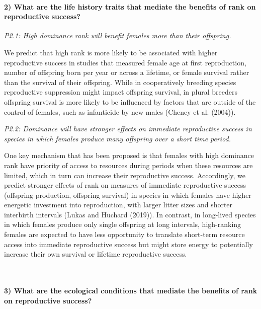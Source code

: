 \documentclass[]{article}
\let\oldparagraph\paragraph
\renewcommand{\paragraph}[1]{\oldparagraph{#1}\mbox{}}
\begin{document}
\hypertarget{what-are-the-life-history-traits-that-mediate-the-benefits-of-rank-on-reproductive-success-1}{%
\paragraph{\texorpdfstring{\textbf{2) What are the life history traits
that mediate the benefits of rank on reproductive
success?}}{2) What are the life history traits that mediate the benefits of rank on reproductive success?}}\label{what-are-the-life-history-traits-that-mediate-the-benefits-of-rank-on-reproductive-success-1}}

\emph{P2.1: High dominance rank will benefit females more than their
offspring.}

We predict that high rank is more likely to be associated with higher
reproductive success in studies that measured female age at first
reproduction, number of offspring born per year or across a lifetime, or
female survival rather than the survival of their offspring. While in
cooperatively breeding species reproductive suppression might impact
offspring survival, in plural breeders offspring survival is more likely
to be influenced by factors that are outside of the control of females,
such as infanticide by new males (Cheney et al. (2004)).

\emph{P2.2: Dominance will have stronger effects on immediate
reproductive success in species in which females produce many offspring
over a short time period.}

One key mechanism that has been proposed is that females with high
dominance rank have priority of access to resources during periods when
these resources are limited, which in turn can increase their
reproductive success. Accordingly, we predict stronger effects of rank
on measures of immediate reproductive success (offspring production,
offspring survival) in species in which females have higher energetic
investment into reproduction, with larger litter sizes and shorter
interbirth intervals (Lukas and Huchard (2019)). In contrast, in
long-lived species in which females produce only single offspring at
long intervals, high-ranking females are expected to have less
opportunity to translate short-term resource access into immediate
reproductive success but might store energy to potentially increase
their own survival or lifetime reproductive success.

~

\hypertarget{what-are-the-ecological-conditions-that-mediate-the-benefits-of-rank-on-reproductive-success-1}{%
\paragraph{\texorpdfstring{\textbf{3) What are the ecological conditions
that mediate the benefits of rank on reproductive
success?}}{3) What are the ecological conditions that mediate the benefits of rank on reproductive success?}}\label{what-are-the-ecological-conditions-that-mediate-the-benefits-of-rank-on-reproductive-success-1}}
\end{document}
